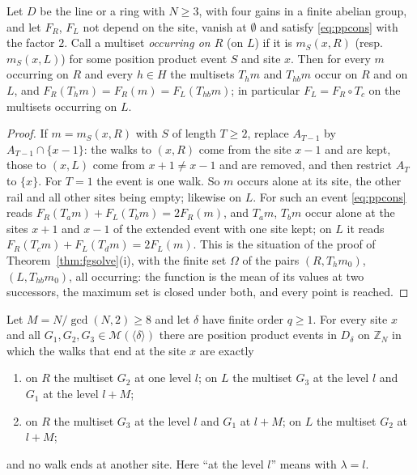 \begin{lemma}\label{lem:fginv}
Let $D$ be the line or a ring with $N\ge3$, with four gains in a finite abelian group, and let $F_R$, $F_L$ not depend on the site, vanish at $\emptyset$ and satisfy \eqref{eq:ppcons} with the factor $2$. Call a multiset \emph{occurring on $R$} (on $L$) if it is $m_S(x,R)$ (resp.\ $m_S(x,L)$) for some position product event $S$ and site $x$. Then for every $m$ occurring on $R$ and every $h\in H$ the multisets $T_hm$ and $T_{hb}m$ occur on $R$ and on $L$, and $F_R(T_hm)=F_R(m)=F_L(T_{hb}m)$; in particular $F_L=F_R\circ T_c$ on the multisets occurring on $L$.
\end{lemma}
\begin{proof}
If $m=m_S(x,R)$ with $S$ of length $T\ge2$, replace $A_{T-1}$ by $A_{T-1}\cap\{x-1\}$: the walks to $(x,R)$ come from the site $x-1$ and are kept, those to $(x,L)$ come from $x+1\ne x-1$ and are removed, and then restrict $A_T$ to $\{x\}$. For $T=1$ the event is one walk. So $m$ occurs alone at its site, the other rail and all other sites being empty; likewise on $L$. For such an event \eqref{eq:ppcons} reads $F_R(T_am)+F_L(T_bm)=2F_R(m)$, and $T_am$, $T_bm$ occur alone at the sites $x+1$ and $x-1$ of the extended event with one site kept; on $L$ it reads $F_R(T_cm)+F_L(T_dm)=2F_L(m)$. This is the situation of the proof of Theorem~\ref{thm:fgsolve}(i), with the finite set $\Omega$ of the pairs $(R,T_hm_0)$, $(L,T_{hb}m_0)$, all occurring: the function is the mean of its values at two successors, the maximum set is closed under both, and every point is reached.
\end{proof}

\begin{proposition}\label{prop:threegroups}
Let $M=N/\gcd(N,2)\ge8$ and let $\delta$ have finite order $q\ge1$. For every site $x$ and all $G_1,G_2,G_3\in\mathcal{M}(\langle\delta\rangle)$ there are position product events in $D_\delta$ on $\mathbb{Z}_N$ in which the walks that end at the site $x$ are exactly
\begin{enumerate}[label=(\roman*)]
\item on $R$ the multiset $G_2$ at one level $l$; on $L$ the multiset $G_3$ at the level $l$ and $G_1$ at the level $l+M$;
\item on $R$ the multiset $G_3$ at the level $l$ and $G_1$ at $l+M$; on $L$ the multiset $G_2$ at $l+M$;
\end{enumerate}
and no walk ends at another site. Here ``at the level $l$'' means with $\lambda=l$.
\end{proposition}

